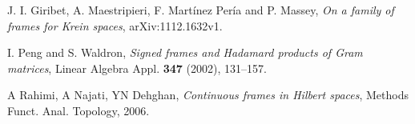 \begin{titlepage}
\begin{thebibliography}{99}
J. I. Giribet, A. Maestripieri, F. Mart\'inez Per\'ia and P. Massey, \textit{On a family of frames for Krein spaces},
	 arXiv:1112.1632v1.

I. Peng and S. Waldron, \textit{Signed frames and Hadamard products of Gram matrices}, Linear Algebra Appl. \textbf{347} (2002), 131--157.


A Rahimi, A Najati, YN Dehghan, \textit{Continuous frames in Hilbert spaces}, Methods Funct. Anal. Topology, 2006.

\end{thebibliography}
\end{titlepage}
